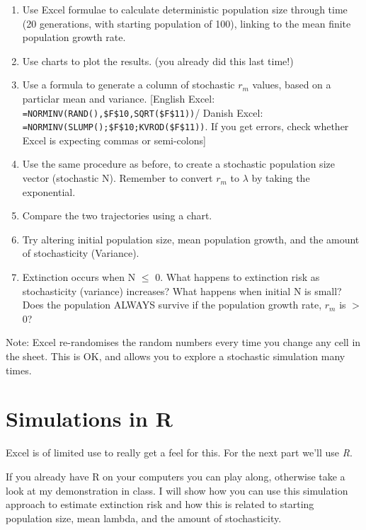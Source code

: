 \documentclass[
  a4paper]{book}
\providecommand{\tightlist}{%
  \setlength{\itemsep}{0pt}\setlength{\parskip}{0pt}}
\begin{document}
\begin{enumerate}
\def\labelenumi{\arabic{enumi})}
\tightlist
\item
  Use Excel formulae to calculate deterministic population size through time (20 generations, with starting population of 100), linking to the mean finite population growth rate.
\item
  Use charts to plot the results. (you already did this last time!)
\item
  Use a formula to generate a column of stochastic \(r_m\) values, based on a particlar mean and variance. {[}English Excel: \texttt{=NORMINV(RAND(),\$F\$10,SQRT(\$F\$11))}/ Danish Excel: \texttt{=NORMINV(SLUMP();\$F\$10;KVROD(\$F\$11))}. If you get errors, check whether Excel is expecting commas or semi-colons{]}
\item
  Use the same procedure as before, to create a stochastic population size vector (stochastic N). Remember to convert \(r_m\) to \(\lambda\) by taking the exponential.
\item
  Compare the two trajectories using a chart.
\item
  Try altering initial population size, mean population growth, and the amount of stochasticity (Variance).
\item
  Extinction occurs when N \(\leq\) 0. What happens to extinction risk as stochasticity (variance) increases? What happens when initial N is small? Does the population ALWAYS survive if the population growth rate, \(r_m\) is \(>\) 0?
\end{enumerate}

\begin{do-something}
Note: Excel re-randomises the random numbers every time you change any
cell in the sheet. This is OK, and allows you to explore a stochastic
simulation many times.
\end{do-something}

\hypertarget{simulations-in-r}{%
\section{Simulations in R}\label{simulations-in-r}}

Excel is of limited use to really get a feel for this. For the next part we'll use \emph{R}.

If you already have R on your computers you can play along, otherwise take a look at my demonstration in class. I will show how you can use this simulation approach to estimate extinction risk and how this is related to starting population size, mean lambda, and the amount of stochasticity.
\end{document}
